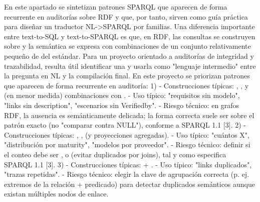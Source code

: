 {}En este apartado se sintetizan patrones SPARQL que aparecen de forma recurrente en auditorías sobre RDF y que, por tanto, sirven como guía práctica para diseñar un traductor NL->SPARQL por familias. Una diferencia importante entre text-to-SQL y text-to-SPARQL es que, en RDF, las consultas se construyen sobre  y la semántica se expresa con combinaciones de un conjunto relativamente pequeño de  del estándar. Para un proyecto orientado a auditorías de integridad y trazabilidad, resulta útil identificar una  y usarla como "lenguaje intermedio" entre la pregunta en NL y la compilación final.\markdownRendererInterblockSeparator
{}En este proyecto se priorizan patrones que aparecen de forma recurrente en auditoría:\markdownRendererInterblockSeparator
{}1)  - Construcciones típicas: , , y (en menor medida) combinaciones con . - Uso típico: "requisitos sin modelo", "links sin description", "escenarios sin Verifiedby". - Riesgo técnico: en grafos RDF, la ausencia es semánticamente delicada; la forma correcta suele ser  sobre el patrón exacto (no "comparar contra NULL"), conforme a SPARQL 1.1 [3].\markdownRendererInterblockSeparator
{}2)  - Construcciones típicas: , ,  (y proyecciones agregadas). - Uso típico: "cuántos X", "distribución por maturity", "modelos por proveedor". - Riesgo técnico: definir si el conteo debe ser ,  o  (evitar duplicados por joins), tal y como especifica SPARQL 1.1 [3].\markdownRendererInterblockSeparator
{}3)  - Construcciones típicas:  + . - Uso típico: "links duplicados", "trazas repetidas". - Riesgo técnico: elegir la clave de agrupación correcta (p. ej. extremos de la relación + predicado) para detectar duplicados semánticos aunque existan múltiples nodos de enlace.\markdownRendererInterblockSeparator
